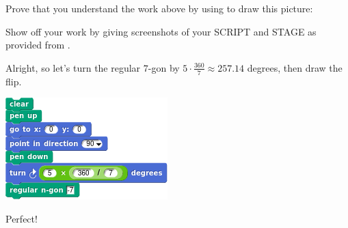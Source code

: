 \documentclass[noauthor,nooutcomes,handout]{ximera}
\begin{document}
\begin{question}
  Prove that you understand the work above by using
  to draw this picture:
  \begin{center}
  \end{center}
  Show off your work by giving screenshots of your SCRIPT and STAGE as
  provided from \snap.
  \begin{freeResponse}
    Alright, so let's turn the regular $7$-gon by $5\cdot \frac{360}{7}\approx 257.14$ degrees, then draw the flip.
    \begin{center}
      \includegraphics[width=.3\textwidth]{sevenGonBasicSCRIPT.png}   \qquad {}
    \end{center}
    Perfect!
  \end{freeResponse}
\end{question}
\end{document}
